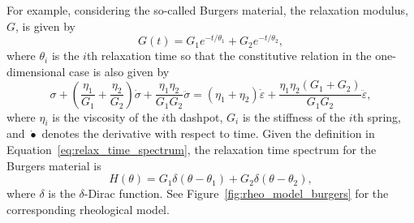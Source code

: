 For example, considering the so-called Burgers material, the relaxation modulus, $G$, is given by \citep{malkinRheologyConceptsMethods2017}
\begin{equation}
\label{eq:relaxation_modulus_burgers}
  G(t)=G_{1} e^{-t / \theta_{1}} + G_2 e^{-t/\theta_2},
\end{equation}
where $\theta_i$ is the $i$th relaxation time so that the constitutive relation in the one-dimensional case is also given by
\begin{equation}
  \sigma + \left(\frac{\eta_1}{G_1} + \frac{\eta_2}{G_2}\right) \dot \sigma + \frac{\eta_1\eta_2}{G_1G_2}\ddot \sigma = (\eta_1 + \eta_2)\dot\varepsilon + \frac{\eta_1\eta_2(G_1 + G_2)}{G_1G_2}\ddot\varepsilon,
\end{equation}
where $\eta_i$ is the viscosity of the $i$th dashpot, $G_i$ is the stiffness of the $i$th spring, and $\dot{\bullet}$ denotes the derivative with respect to time.
Given the definition in Equation~\eqref{eq:relax_time_spectrum}, the relaxation time spectrum for the Burgers material is
\begin{equation}
  H(\theta) = G_1 \delta(\theta - \theta_1) + G_2 \delta(\theta - \theta_2),
\end{equation}
where $\delta$ is the $\delta$-Dirac function.
See Figure~\ref{fig:rheo_model_burgers} for the corresponding rheological model.

